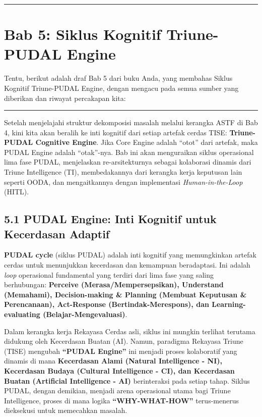 \documentclass[
  letterpaper,
  DIV=11,
  numbers=noendperiod]{scrreprt}
\begin{document}
\begin{center}\rule{0.5\linewidth}{0.5pt}\end{center}


\chapter{\texorpdfstring{\textbf{Bab 5: Siklus Kognitif Triune-PUDAL
Engine}}{Bab 5: Siklus Kognitif Triune-PUDAL Engine}}\label{bab-5-siklus-kognitif-triune-pudal-engine}

Tentu, berikut adalah draf Bab 5 dari buku Anda, yang membahas Siklus
Kognitif Triune-PUDAL Engine, dengan mengacu pada semua sumber yang
diberikan dan riwayat percakapan kita:

\begin{center}\rule{0.5\linewidth}{0.5pt}\end{center}

Setelah menjelajahi struktur dekomposisi masalah melalui kerangka ASTF
di Bab 4, kini kita akan beralih ke inti kognitif dari setiap artefak
cerdas TISE: \textbf{Triune-PUDAL Cognitive Engine}. Jika Core Engine
adalah ``otot'' dari artefak, maka PUDAL Engine adalah ``otak''-nya. Bab
ini akan menguraikan siklus operasional lima fase PUDAL, menjelaskan
re-arsitekturnya sebagai kolaborasi dinamis dari Triune Intelligence
(TI), membedakannya dari kerangka kerja keputusan lain seperti OODA, dan
mengaitkannya dengan implementasi \emph{Human-in-the-Loop} (HITL).

\section{\texorpdfstring{\textbf{5.1 PUDAL Engine: Inti Kognitif untuk
Kecerdasan
Adaptif}}{5.1 PUDAL Engine: Inti Kognitif untuk Kecerdasan Adaptif}}\label{pudal-engine-inti-kognitif-untuk-kecerdasan-adaptif}

\textbf{PUDAL cycle} (siklus PUDAL) adalah inti kognitif yang
memungkinkan artefak cerdas untuk menunjukkan kecerdasan dan kemampuan
beradaptasi. Ini adalah \emph{loop} operasional fundamental yang terdiri
dari lima fase yang saling berhubungan: \textbf{Perceive
(Merasa/Mempersepsikan), Understand (Memahami), Decision-making \&
Planning (Membuat Keputusan \& Perencanaan), Act-Response
(Bertindak-Merespons), dan Learning-evaluating (Belajar-Mengevaluasi)}.

Dalam kerangka kerja Rekayasa Cerdas asli, siklus ini mungkin terlihat
terutama didukung oleh Kecerdasan Buatan (AI). Namun, paradigma Rekayasa
Triune (TISE) mengubah \textbf{``PUDAL Engine''} ini menjadi proses
kolaboratif yang dinamis di mana \textbf{Kecerdasan Alami (Natural
Intelligence - NI), Kecerdasan Budaya (Cultural Intelligence - CI), dan
Kecerdasan Buatan (Artificial Intelligence - AI)} berinteraksi pada
setiap tahap. Siklus PUDAL, dengan demikian, menjadi arena operasional
utama bagi Triune Intelligence, proses di mana logika
\textbf{``WHY-WHAT-HOW''} terus-menerus dieksekusi untuk memecahkan
masalah.
\end{document}
